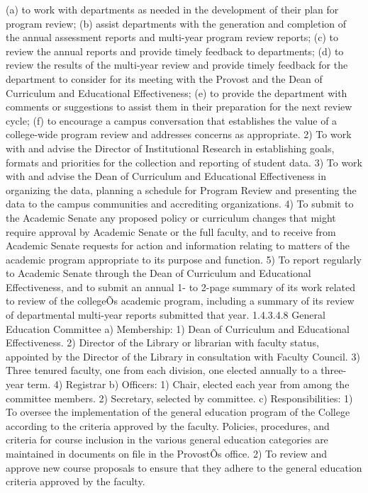 \documentclass[letterpaper, 11pt]{article}
\begin{document}
			(a) to work with departments as needed in the development of their plan for program review;
			(b) assist departments with the generation and completion of the annual assessment reports and multi-year program review reports;
			(c) to review the annual reports and provide timely feedback to departments;
			(d) to review the results of the multi-year review and provide timely feedback for the department to consider for its meeting with the Provost and the Dean of Curriculum and Educational Effectiveness;
			(e) to provide the department with comments or suggestions to assist them in their preparation for the next review cycle;
			(f) to encourage a campus conversation that establishes the value of a college-wide program review and addresses concerns as appropriate.
			2) To work with and advise the Director of Institutional Research in establishing goals, formats and priorities for the collection and reporting of student data.
			3) To work with and advise the Dean of Curriculum and Educational Effectiveness in organizing the data, planning a schedule for Program Review and presenting the data to the campus communities and accrediting organizations.
			4) To submit to the Academic Senate any proposed policy or curriculum changes that might require approval by Academic Senate or the full faculty, and to receive from Academic Senate requests for action and information relating to matters of the academic program appropriate to its purpose and function.
			5) To report regularly to Academic Senate through the Dean of Curriculum and Educational Effectiveness, and to submit an annual 1- to 2-page summary of its work related to review of the collegeÕs academic program, including a summary of its review of departmental multi-year reports submitted that year.
			1.4.3.4.8 General Education Committee
			a) Membership:
			1) Dean of Curriculum and Educational Effectiveness.
			2) Director of the Library or librarian with faculty status, appointed by the Director of the Library in consultation with Faculty Council.
			3) Three tenured faculty, one from each division, one elected annually to a three-year term.
			4) Registrar
			b) Officers:
			1) Chair, elected each year from among the committee members.
			2) Secretary, selected by committee.
			c) Responsibilities:
			1) To oversee the implementation of the general education program of the College according to the criteria approved by the faculty.  Policies, procedures, and criteria for course inclusion in the various general education categories are maintained in documents on file in the ProvostÕs office.
			2) To review and approve new course proposals to ensure that they adhere to the general education criteria approved by the faculty.
\end{document}
